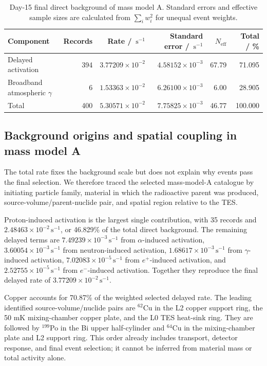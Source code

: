 \documentclass[11pt]{article}
\newcommand{\cps}{\ensuremath{\,\mathrm{s^{-1}}}}
\begin{document}
\begin{table}[H]
\centering
\caption{Day-15 final direct background of mass model A. Standard errors and effective sample sizes are calculated from $\sum_i w_i^2$ for unequal event weights.}
\label{tab:reference_background_budget}
\footnotesize
\begin{tabular}{lrrrrr}
\toprule
Component & Records & Rate / $\cps$ & Standard error / $\cps$ & $N_{\mathrm{eff}}$ & Total / \% \\
\midrule
Delayed activation & 394 & $3.77209\times10^{-2}$ & $4.58152\times10^{-3}$ & 67.79 & 71.095 \\
Broadband atmospheric $\gamma$ & 6 & $1.53363\times10^{-2}$ & $6.26100\times10^{-3}$ & 6.00 & 28.905 \\
\midrule
Total & 400 & $5.30571\times10^{-2}$ & $7.75825\times10^{-3}$ & 46.77 & 100.000 \\
\bottomrule
\end{tabular}
\end{table}

\subsection{Background origins and spatial coupling in mass model A}
\label{subsec:mass_model_a_origins}

The total rate fixes the background scale but does not explain why events pass the final selection. We therefore traced the selected mass-model-A catalogue by initiating particle family, material in which the radioactive parent was produced, source-volume/parent-nuclide pair, and spatial region relative to the TES.

Proton-induced activation is the largest single contribution, with 35 records and $2.48463\times10^{-2}\cps$, or 46.829\% of the total direct background. The remaining delayed terms are $7.49239\times10^{-3}\cps$ from $\alpha$-induced activation, $3.60054\times10^{-3}\cps$ from neutron-induced activation, $1.68617\times10^{-3}\cps$ from $\gamma$-induced activation, $7.02083\times10^{-5}\cps$ from $e^+$-induced activation, and $2.52755\times10^{-5}\cps$ from $e^-$-induced activation. Together they reproduce the final delayed rate of $3.77209\times10^{-2}\cps$.

Copper accounts for 70.87\% of the weighted selected delayed rate. The leading identified source-volume/nuclide pairs are $^{62}$Cu in the L2 copper support ring, the 50 mK mixing-chamber copper plate, and the L0 TES heat-sink ring. They are followed by $^{199}$Po in the Bi upper half-cylinder and $^{64}$Cu in the mixing-chamber plate and L2 support ring. This order already includes transport, detector response, and final event selection; it cannot be inferred from material mass or total activity alone.
\end{document}

